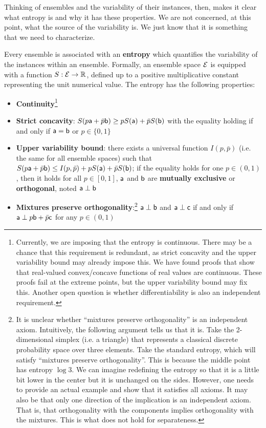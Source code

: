 Thinking of ensembles and the variability of their instances, then, makes it clear what entropy is and why it has these properties. We are not concerned, at this point, what the source of the variability is. We just know that it is something that we need to characterize.

\begin{mathSection}
\begin{axiom}\label{pm-es-axiomEntropy}
	Every ensemble is associated with an \textbf{entropy} which quantifies the variability of the instances within an ensemble. Formally, an ensemble space $\Ens$ is equipped with a function $S : \Ens \to \mathbb{R}$, defined up to a positive multiplicative constant representing the unit numerical value. The entropy has the following properties:
	\begin{itemize}
		\item \textbf{Continuity}\footnote{Currently, we are imposing that the entropy is continuous. There may be a chance that this requirement is redundant, as strict concavity and the upper variability bound may already impose this. We have found proofs that show that real-valued convex/concave functions of real values are continuous. These proofs fail at the extreme points, but the upper variability bound may fix this. Another open question is whether differentiability is also an independent requirement.}
		\item \textbf{Strict concavity}: $S(p\ens[a] + \bar{p} \ens[b]) \geq p S(\ens[a]) + \bar{p} S(\ens[b])$ with the equality holding if and only if $\ens[a] = \ens[b]$ or $p \in \{0,1\}$
		\item \textbf{Upper variability bound}: there exists a universal function $I(p, \bar{p})$ (i.e. the same for all ensemble spaces) such that $S(p\ens[a] + \bar{p} \ens[b]) \leq I(p, \bar{p}) + p S(\ens[a]) + \bar{p} S(\ens[b])$; if the equality holds for one $p \in (0,1)$, then it holds for all $p \in [0,1]$, $\ens[a]$ and $\ens[b]$ are \textbf{mutually exclusive} or \textbf{orthogonal}, noted $\ens[a] \ortho \ens[b]$
		\item \textbf{Mixtures preserve orthogonality}:\footnote{It is unclear whether ``mixtures preserve orthogonality'' is an independent axiom. Intuitively, the following argument tells us that it is. Take the 2-dimensional simplex (i.e. a triangle) that represents a classical discrete probability space over three elements. Take the standard entropy, which will satisfy ``mixtures preserve orthogonality''. This is because the middle point has entropy $\log 3$. We can imagine redefining the entropy so that it is a little bit lower in the center but it is unchanged on the sides. However, one needs to provide an actual example and show that it satisfies all axioms. It may also be that only one direction of the implication is an independent axiom. That is, that orthogonality with the components implies orthogonality with the mixtures. This is what does not hold for separateness.} $\ens[a] \ortho \ens[b]$ and $\ens[a] \ortho \ens[c]$ if and only if $\ens[a] \ortho p \ens[b] + \bar{p} \ens[c]$ for any $p \in (0,1)$
	\end{itemize}
\end{axiom}


\end{mathSection}
